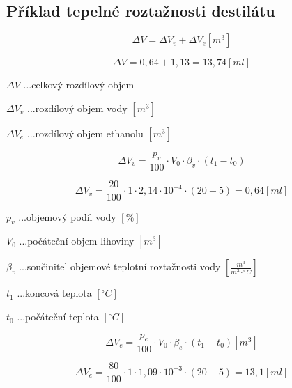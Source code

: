 
\subsection{Příklad tepelné roztažnosti destilátu}
\begin{equation}
\label{objem_kapalina}
    \Delta V = \Delta V_v + \Delta V_e \left[m^3\right]
\end{equation}


\[\Delta V = 0,64 + 1,13 = 13,74 \left[ml\right]\]


\(\Delta V\) ...celkový rozdílový objem

\(\Delta V_{v}\) ...rozdílový objem vody \([m^3]\)

\(\Delta V_{e}\) ...rozdílový objem ethanolu \([m^3]\)


\begin{equation}
    \Delta V_v = \frac{p_v}{100} \cdot V_0 \cdot \beta_v \cdot (t_1 - t_0)
\end{equation}

\[\Delta V_v = \frac{20}{100} \cdot 1 \cdot  2,14 \cdot 10^{-4} \cdot (20 - 5) = 0,64 \left[ml\right]\]

\(p_v\) ...objemový podíl vody \([\%]\) 

\(V_0\) ...počáteční objem lihoviny \([m^3]\)

\(\beta_v\) ...součinitel objemové teplotní roztažnosti vody \([\frac{m^3}{m^3 \cdot ^\circ C}]\)

\(t_1\) ...koncová teplota \([^\circ C]\)

\(t_0\) ...počáteční teplota \([^\circ C]\)

\begin{equation}
    \Delta V_e = \frac{p_e}{100} \cdot V_0 \cdot \beta_e \cdot (t_1 - t_0)\left[m^3\right] \label{objem_kapalina}
\end{equation}

\[\Delta V_e = \frac{80}{100} \cdot 1 \cdot  1,09 \cdot 10^{-3} \cdot (20 - 5) = 13,1 \left[ml\right]\]

